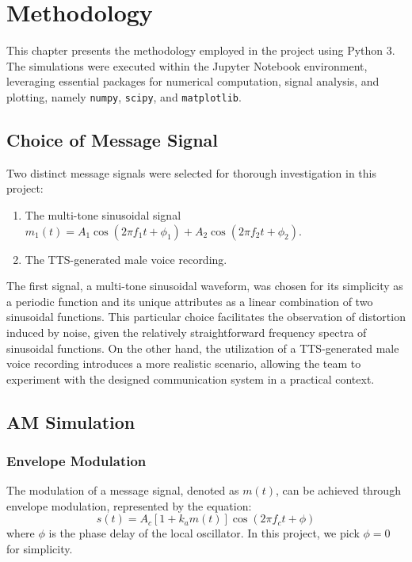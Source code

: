 \documentclass[../ECE459FinalProjectReport.tex]{subfiles}
\begin{document}
\chapter{Methodology}
This chapter presents the methodology employed in the project using Python 3. The simulations were executed within the Jupyter Notebook environment, leveraging essential packages for numerical computation, signal analysis, and plotting, namely \verb|numpy|, \verb|scipy|, and \verb|matplotlib|.

\section{Choice of Message Signal}

Two distinct message signals were selected for thorough investigation in this project:
\begin{enumerate}
    \item The multi-tone sinusoidal signal $m_1 (t) = A_1\cos(2\pi f_1 t + \phi_1) + A_2 \cos(2\pi f_2 t + \phi_2)$.
    \item The TTS-generated male voice recording.
\end{enumerate}

The first signal, a multi-tone sinusoidal waveform, was chosen for its simplicity as a periodic function and its unique attributes as a linear combination of two sinusoidal functions. This particular choice facilitates the observation of distortion induced by noise, given the relatively straightforward frequency spectra of sinusoidal functions. On the other hand, the utilization of a TTS-generated male voice recording introduces a more realistic scenario, allowing the team to experiment with the designed communication system in a practical context.

\section{AM Simulation}
\subsection{Envelope Modulation}

The modulation of a message signal, denoted as $m(t)$, can be achieved through envelope modulation, represented by the equation:
\begin{equation}
    s(t) = A_c [1 + k_a m(t)] \cos (2\pi f_c t + \phi)
\end{equation}
where $\phi$ is the phase delay of the local oscillator. In this project, we pick $\phi = 0$ for simplicity.
\end{document}

